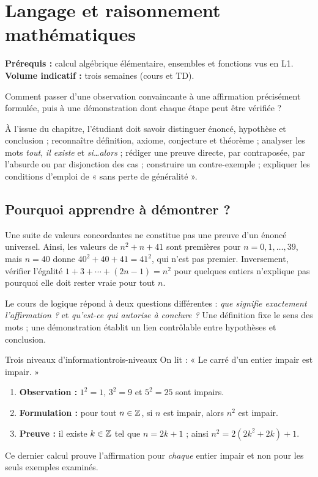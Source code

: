 \chapter{Langage et raisonnement mathématiques}
\label{chap:langage}
\begin{flushleft}\small\sffamily
\textbf{Prérequis :} calcul algébrique élémentaire, ensembles et fonctions vus en L1.\qquad
\textbf{Volume indicatif :} trois semaines (cours et TD).
\end{flushleft}

\begin{questionfondatrice}
Comment passer d'une observation convaincante à une affirmation précisément formulée, puis à une démonstration dont chaque étape peut être vérifiée ?
\end{questionfondatrice}
\begin{objectifs}
À l'issue du chapitre, l'étudiant doit savoir distinguer énoncé, hypothèse et conclusion ; reconnaître définition, axiome, conjecture et théorème ; analyser les mots \emph{tout}, \emph{il existe} et \emph{si\ldots alors} ; rédiger une preuve directe, par contraposée, par l'absurde ou par disjonction des cas ; construire un contre-exemple ; expliquer les conditions d'emploi de « sans perte de généralité ».
\end{objectifs}

\section{Pourquoi apprendre à démontrer ?}
Une suite de valeurs concordantes ne constitue pas une preuve d'un énoncé universel. Ainsi, les valeurs de $n^2+n+41$ sont premières pour $n=0,1,\ldots,39$, mais $n=40$ donne $40^2+40+41=41^2$, qui n'est pas premier. Inversement, vérifier l'égalité $1+3+\cdots+(2n-1)=n^2$ pour quelques entiers n'explique pas pourquoi elle doit rester vraie pour tout $n$.

Le cours de logique répond à deux questions différentes : \emph{que signifie exactement l'affirmation ?} et \emph{qu'est-ce qui autorise à conclure ?} Une définition fixe le sens des mots ; une démonstration établit un lien contrôlable entre hypothèses et conclusion.

\begin{exemple}{Trois niveaux d'information}{trois-niveaux}
On lit : « Le carré d'un entier impair est impair. »
\begin{enumerate}
\item \textbf{Observation :} $1^2=1$, $3^2=9$ et $5^2=25$ sont impairs.
\item \textbf{Formulation :} pour tout $n\in\mathbb Z$, si $n$ est impair, alors $n^2$ est impair.
\item \textbf{Preuve :} il existe $k\in\mathbb Z$ tel que $n=2k+1$ ; ainsi $n^2=2(2k^2+2k)+1$.
\end{enumerate}
Ce dernier calcul prouve l'affirmation pour \emph{chaque} entier impair et non pour les seuls exemples examinés.
\end{exemple}


